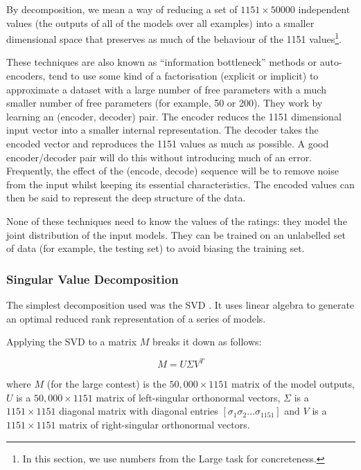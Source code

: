 \documentclass{article}
\begin{document}
By decomposition, we mean a way of reducing a set of $1151\times50000$ independent values (the outputs of all of the models over all examples) into a smaller dimensional space that preserves as much of the behaviour of the 1151 values\footnote{In this section, we use numbers from the Large task for concreteness.}.

These techniques are also known as ``information bottleneck'' methods or auto-encoders, tend to use some kind of a factorisation (explicit or implicit) to approximate a dataset with a large number of free parameters with a much smaller number of free parameters (for example, 50 or 200).
They work by learning an (encoder, decoder) pair.  The encoder reduces the 1151 dimensional input vector into a smaller internal representation.  The decoder takes the encoded vector and reproduces the 1151 values as much as possible.  A good encoder/decoder pair will do this without introducing much of an error.  Frequently, the effect of the (encode, decode) sequence will be to remove noise from the input whilst keeping its essential characteristics.  The encoded values can then be said to represent the deep structure of the data.

None of these techniques need to know the values of the ratings: they model the joint distribution of the input models.
They can be trained on an unlabelled set of data (for example, the testing set) to avoid biasing the training set.

\subsubsection{Singular Value Decomposition}

The simplest decomposition used was the SVD \cite{deerwester90}.  It uses linear algebra to generate an optimal reduced rank representation of a series of models.

Applying the SVD to a matrix $M$ breaks it down as follows:

\begin{equation}
M = U \Sigma V^T
\end{equation}

where $M$ (for the large contest) is the $50,000 \times 1151$ matrix of the model outputs, $U$ is a $50,000 \times 1151$ matrix of left-singular orthonormal vectors, $\Sigma$ is a $1151 \times 1151$ diagonal matrix with diagonal entries $[ \sigma_1 \sigma_2 \ldots \sigma_{1151}]$ and $V$ is a $1151 \times 1151$ matrix of right-singular orthonormal vectors.
\end{document}
